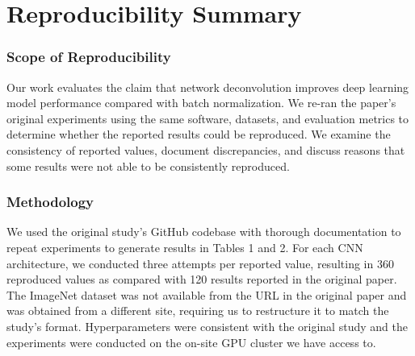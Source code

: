 \vspace{20pt}
\section*{\centering Reproducibility Summary}

\subsubsection*{Scope of Reproducibility}
Our work evaluates the claim that network deconvolution \cite{ye2020network} improves deep learning model performance compared with batch normalization. We re-ran the paper's original experiments using the same software, datasets, and evaluation metrics to determine whether the reported results could be reproduced. We examine the consistency of reported values, document discrepancies, and discuss reasons that some results were not able to be consistently reproduced. %



\subsubsection*{Methodology}

We used the original study's GitHub codebase \cite{githubGitHubYechengxideconvolution} with thorough documentation to repeat experiments to generate results in Tables 1 and 2. For each CNN architecture, we conducted three attempts per reported value, resulting in 360 reproduced values as compared with 120 results reported in the original paper. The ImageNet dataset was not available from the URL in the original paper and was obtained from a different site, requiring us to restructure it to match the study's format. Hyperparameters were consistent with the original study and the experiments were conducted on the on-site GPU cluster we have access to. %

